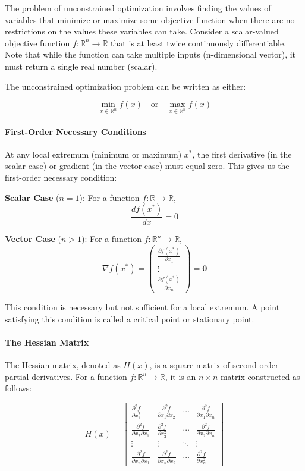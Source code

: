 The problem of unconstrained optimization involves finding the values of variables that minimize or maximize some objective function when there are no restrictions on the values these variables can take. Consider a scalar-valued objective function \(f: \mathbb{R}^n \rightarrow \mathbb{R}\) that is at least twice continuously differentiable. Note that while the function can take multiple inputs (n-dimensional vector), it must return a single real number (scalar).

The unconstrained optimization problem can be written as either:

\[ \min_{x \in \mathbb{R}^n} f(x) \quad \text{or} \quad \max_{x \in \mathbb{R}^n} f(x) \]

\paragraph{First-Order Necessary Conditions}
At any local extremum (minimum or maximum) \(x^*\), the first derivative (in the scalar case) or gradient (in the vector case) must equal zero. This gives us the first-order necessary condition:

\textbf{Scalar Case} (\(n=1\)): For a function \(f: \mathbb{R} \rightarrow \mathbb{R}\),
\[ \frac{d f(x^*)}{dx} = 0 \]

\textbf{Vector Case} (\(n>1\)): For a function \(f: \mathbb{R}^n \rightarrow \mathbb{R}\),
\[ \nabla f(x^*) = \begin{pmatrix} 
\frac{\partial f(x^*)}{\partial x_1} \\
\vdots \\
\frac{\partial f(x^*)}{\partial x_n}
\end{pmatrix} = \mathbf{0} \]

This condition is necessary but not sufficient for a local extremum. A point satisfying this condition is called a critical point or stationary point.

\paragraph{The Hessian Matrix}
The Hessian matrix, denoted as \(H(x)\), is a square matrix of second-order partial derivatives. For a function \(f: \mathbb{R}^n \rightarrow \mathbb{R}\), it is an \(n \times n\) matrix constructed as follows:

\[ H(x) = \begin{bmatrix}
\frac{\partial^2 f}{\partial x_1^2} & \frac{\partial^2 f}{\partial x_1 \partial x_2} & \cdots & \frac{\partial^2 f}{\partial x_1 \partial x_n} \\
\frac{\partial^2 f}{\partial x_2 \partial x_1} & \frac{\partial^2 f}{\partial x_2^2} & \cdots & \frac{\partial^2 f}{\partial x_2 \partial x_n} \\
\vdots & \vdots & \ddots & \vdots \\
\frac{\partial^2 f}{\partial x_n \partial x_1} & \frac{\partial^2 f}{\partial x_n \partial x_2} & \cdots & \frac{\partial^2 f}{\partial x_n^2}
\end{bmatrix} \]

